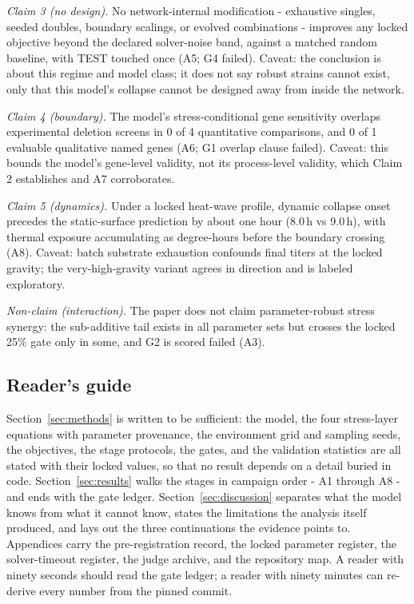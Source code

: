 \documentclass[12pt]{article}
\begin{document}
\emph{Claim 3 (no design).} No network-internal modification -
exhaustive singles, seeded doubles, boundary scalings, or evolved
combinations - improves any locked objective beyond the declared
solver-noise band, against a matched random baseline, with TEST
touched once (A5; G4 failed). Caveat: the conclusion is about this
regime and model class; it does not say robust strains cannot exist,
only that this model's collapse cannot be designed away from inside
the network.

\emph{Claim 4 (boundary).} The model's stress-conditional gene
sensitivity overlaps experimental deletion screens in 0 of 4
quantitative comparisons, and 0 of 1 evaluable qualitative named
genes (A6; G1 overlap clause failed). Caveat: this bounds the model's
gene-level validity, not its process-level validity, which Claim 2
establishes and A7 corroborates.

\emph{Claim 5 (dynamics).} Under a locked heat-wave profile, dynamic
collapse onset precedes the static-surface prediction by about one
hour (8.0\,h vs 9.0\,h), with thermal exposure accumulating as
degree-hours before the boundary crossing (A8). Caveat: batch
substrate exhaustion confounds final titers at the locked gravity;
the very-high-gravity variant agrees in direction and is labeled
exploratory.

\emph{Non-claim (interaction).} The paper does not claim
parameter-robust stress synergy: the sub-additive tail exists in all
parameter sets but crosses the locked 25\% gate only in some, and G2
is scored failed (A3).

\subsection{Reader's guide}

Section~\ref{sec:methods} is written to be sufficient: the model, the
four stress-layer equations with parameter provenance, the
environment grid and sampling seeds, the objectives, the stage
protocols, the gates, and the validation statistics are all stated
with their locked values, so that no result depends on a detail
buried in code. Section~\ref{sec:results} walks the stages in
campaign order - A1 through A8 - and ends with the gate ledger.
Section~\ref{sec:discussion} separates what the model knows from what
it cannot know, states the limitations the analysis itself produced,
and lays out the three continuations the evidence points to.
Appendices carry the pre-registration record, the locked parameter
register, the solver-timeout register, the judge archive, and the
repository map. A reader with ninety seconds should read the gate
ledger; a reader with ninety minutes can re-derive every number from
the pinned commit.
\end{document}
